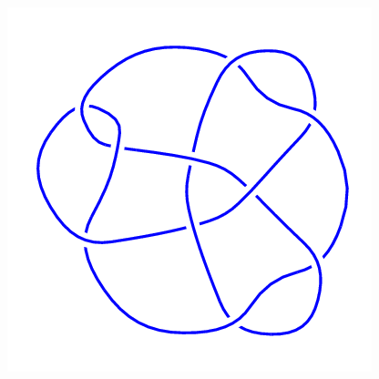 \begin{figure}[H]
\begin{minipage}[b]{.18\linewidth}
	\end{minipage}
	\begin{minipage}[b]{.18\linewidth}
		\centering
		\includegraphics[width=\linewidth]{../data/10_101.png}
	\end{minipage}
\end{figure}
